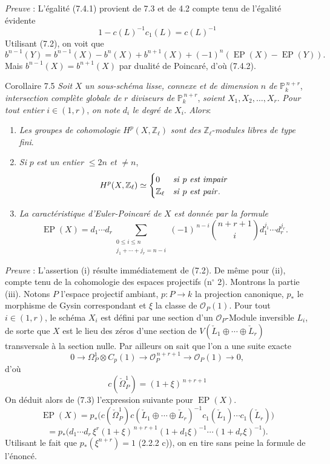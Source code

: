 \emph{Preuve} : L'égalité (7.4.1) provient de 7.3 et de 4.2 compte tenu de l'égalité évidente
\[
1-c(L)^{-1}c_1(L)=c(L)^{-1}
\]
Utilisant (7.2), on voit que
\[
b^{n-1}(Y)=b^{n-1}(X)-b^n(X)+b^{n+1}(X)+(-1)^n(\operatorname{EP}(X)-\operatorname{EP}(Y)).
\]
Mais $b^{n-1}(X)=b^{n+1}(X)$ par dualité de Poincaré, d'où (7.4.2).

\begin{statement}{Corollaire 7.5}
\emph{Soit} $X$ \emph{un sous-schéma lisse, connexe et de dimension} $n$ \emph{de} $\mathbb{P}_k^{\,n+r}$, \emph{intersection complète globale de} $r$ \emph{diviseurs de} $\mathbb{P}_k^{\,n+r}$, \emph{soient} $X_1,X_2,\ldots,X_r$. \emph{Pour tout entier} $i\in(1,r)$, \emph{on note} $d_i$ \emph{le degré de} $X_i$. \emph{Alors}:
\begin{enumerate}[label=(\roman*)]
\item \emph{Les groupes de cohomologie} $H^p(X,\mathbb{Z}_\ell)$ \emph{sont des} $\mathbb{Z}_\ell$-\emph{modules libres de type fini}.
\item \emph{Si} $p$ \emph{est un entier} $\le 2n$ \emph{et} $\ne n$,
\[
H^p(X,\mathbb{Z}_\ell)\simeq
\begin{cases}
0&\text{\emph{si} }p\text{ \emph{est impair}}\\
\mathbb{Z}_\ell&\text{\emph{si} }p\text{ \emph{est pair}}.
\end{cases}
\]
\item \emph{La caractéristique d'Euler-Poincaré de} $X$ \emph{est donnée par la formule}
\[
\operatorname{EP}(X)
=d_1\cdots d_r
\sum_{\substack{0\le i\le n\\ j_1+\cdots+j_r=n-i}}
(-1)^{\,n-i}\binom{n+r+1}{i}
d_1^{j_1}\cdots d_r^{j_r}.
\]
\end{enumerate}
\end{statement}

\emph{Preuve} : L'assertion (i) résulte immédiatement de (7.2). De même pour (ii), compte tenu de la cohomologie des espaces projectifs (n$^\circ$ 2). Montrons la partie (iii). Notons $P$ l'espace projectif ambiant, $p:P\to k$ la projection canonique, $p_*$ le morphisme de Gysin 
correspondant et $\xi$ la classe de $\mathcal{O}_P(1)$. Pour tout $i\in(1,r)$, le schéma $X_i$ est défini par une
section d'un $\mathcal{O}_P$-Module inversible $L_i$, de sorte que $X$ est le lieu des zéros d'une section de $V(\check L_1\oplus\cdots\oplus\check L_r)$ transversale à la section nulle. Par ailleurs on sait que l'on a une suite exacte
\[
0\to\Omega_P^1\otimes C_p(1)\to\mathcal{O}_P^{\,n+r+1}\to\mathcal{O}_P(1)\to0,
\]
d'où
\[
c(\check\Omega_P^1)=(1+\xi)^{\,n+r+1}
\]
On déduit alors de (7.3) l'expression suivante pour $\operatorname{EP}(X)$.
\[
\operatorname{EP}(X)
=p_*\bigl(c(\check\Omega_P^1)c(\check L_1\oplus\cdots\oplus\check L_r)^{-1}
c_1(\check L_1)\cdots c_1(\check L_r)\bigr)
\]
\[
=p_*\bigl(d_1\cdots d_r\,\xi^r(1+\xi)^{\,n+r+1}
(1+d_1\xi)^{-1}\cdots(1+d_r\xi)^{-1}\bigr).
\]
Utilisant le fait que $p_*(\xi^{n+r})=1$ (2.2.2 c)), on en tire sans peine la formule de l'énoncé.

